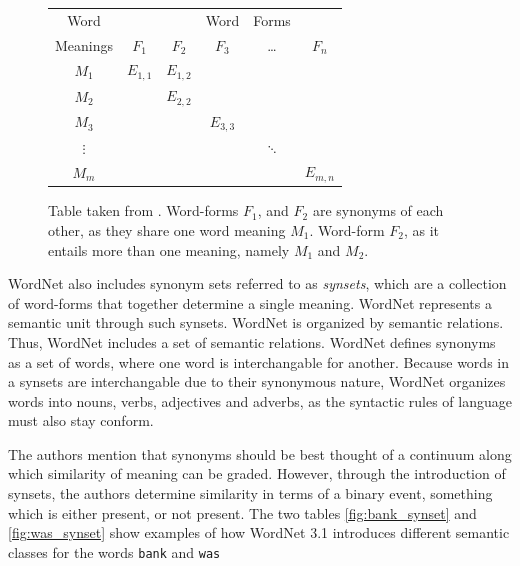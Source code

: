 \documentclass[a4paper,12pt,oneside,openright]{report}
\begin{document}
\begin{figure}
\begin{center}
\begin{tabular}{ | c | c  c  c  c  c | } 
 \hline
 Word        &  &  & Word & Forms &  \\ 
 Meanings & $F_1$ & $F_2$ & $F_3$ & \ldots & $F_n$ \\ 
 \hline
 $M_1$     & $E_{1,1}$ & $E_{1,2}$ &  &  &  \\ 
 $M_2$     &  & $E_{2,2}$ &  &  &  \\ 
 $M_3$     &  &  & $E_{3, 3}$ &  &  \\ 
 $\vdots$ &  &  &  & $\ddots$ &  \\ 
 $M_m$    &  &  &  &  & $E_{m, n}$ \\ 
 \hline
\end{tabular}
\end{center}
\caption{Table taken from \cite{miller90}. Word-forms $F_1$, and $F_2$ are synonyms of each other, as they share one word meaning $M_1$. Word-form $F_2$, as it entails more than one meaning, namely $M_1$ and $M_2$.}
\label{fig:wordnet_table}
\end{figure}

WordNet also includes synonym sets referred to as \textit{synsets}, which are a collection of word-forms that together determine a single meaning.
WordNet represents a semantic unit through such synsets.
WordNet is organized by semantic relations.
Thus, WordNet includes a set of semantic relations.
WordNet defines synonyms as a set of words, where one word is interchangable for another.
Because words in a synsets are interchangable due to their synonymous nature, WordNet organizes words into nouns, verbs, adjectives and adverbs, as the syntactic rules of language must also stay conform.

The authors mention that synonyms should be best thought of a continuum along which similarity of meaning can be graded.
However, through the introduction of synsets, the authors determine similarity in terms of a binary event, something which is either present, or not present.
The two tables \ref{fig:bank_synset} and \ref{fig:was_synset} show examples of how WordNet 3.1 introduces different semantic classes for the words \Verb#bank# and \Verb#was#
\end{document}
